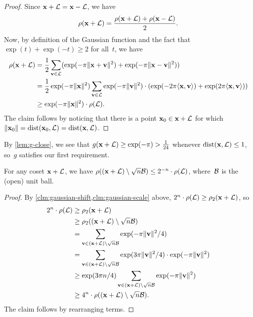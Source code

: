 \documentclass[11pt]{article}
\begin{document}
\begin{proof}
  Since $\mathbf{x}+\mathcal{L} = \mathbf{x}-\mathcal{L}$, we have
  \[ \rho(\mathbf{x}+\mathcal{L}) = \frac{\rho(\mathbf{x}+\mathcal{L}) +
      \rho(\mathbf{x}-\mathcal{L})}{2}. \] Now, by definition of the Gaussian
  function and the fact that $\exp(t) + \exp(-t) \geq 2$ for all~$t$,
  we have
  \begin{align*}
    \rho(\mathbf{x}+\mathcal{L})
    &= \frac12 \sum_{\mathbf{v} \in \mathcal{L}} ( \exp(-\pi \lVert\mathbf{x}+\mathbf{v}\rVert^2)+ \exp(-\pi \lVert\mathbf{x}-\mathbf{v}\rVert^2)) \\
    &= \frac12 \exp(-\pi \lVert\mathbf{x}\rVert^2)
      \sum_{\mathbf{v} \in \mathcal{L}} \exp(-\pi \lVert\mathbf{v}\rVert^2) \cdot
      (\exp(-2\pi \langle\mathbf{x},\mathbf{v}\rangle)+\exp(2\pi \langle\mathbf{x},\mathbf{v}\rangle)) \\
    &\geq \exp(-\pi \lVert\mathbf{x}\rVert^{2}) \cdot \rho(\mathcal{L}) .
  \end{align*}
  The claim follows by noticing that there is a point
  $\mathbf{x}_0 \in \mathbf{x} + \mathcal{L}$ for which
  $\lVert\mathbf{x}_0\rVert=\operatorname{dist}(\mathbf{x}_0,\mathcal{L}) = \operatorname{dist}(\mathbf{x},\mathcal{L})$.
\end{proof}
By \cref{lem:g-close}, we see that
$g(\mathbf{x} + \mathcal{L}) \geq \exp(-\pi) > \tfrac{1}{24}$ whenever
$\operatorname{dist}(\mathbf{x},\mathcal{L}) \leq 1$, so~$g$ satisfies our first requirement.

\begin{lemma}
  \label{lem:gaussian-mass-far}
  For any coset $\mathbf{x} + \mathcal{L}$, we have
  $\rho((\mathbf{x} + \mathcal{L}) \setminus \sqrt{n}\mathcal{B}) \leq 2^{-n} \cdot
  \rho(\mathcal{L})$, where~$\mathcal{B}$ is the (open) unit ball.
\end{lemma}

\begin{proof}
  By \cref{clm:gaussian-shift,clm:gaussian-scale} above,
  $2^n \cdot \rho(\mathcal{L}) \geq \rho_2(\mathbf{x} + \mathcal{L})$, so
  \begin{align*}
    2^n \cdot \rho(\mathcal{L})
    &\geq \rho_2(\mathbf{x} + \mathcal{L}) \\
    &\geq \rho_2((\mathbf{x} + \mathcal{L})\setminus \sqrt{n}\mathcal{B}) \\
    &= \sum_{\mathbf{v} \in (\mathbf{x} + \mathcal{L}) \setminus \sqrt{n}\mathcal{B}} \exp(-\pi \lVert\mathbf{v}\rVert^2/4) \\
    &= \sum_{\mathbf{v} \in (\mathbf{x} + \mathcal{L}) \setminus \sqrt{n}\mathcal{B}}
      \exp(3\pi \lVert\mathbf{v}\rVert^2/4) \cdot \exp(-\pi \lVert\mathbf{v}\rVert^2) \\
    &\geq \exp(3\pi n/4) \sum_{\mathbf{v} \in (\mathbf{x} + \mathcal{L}) \setminus
      \sqrt{n}\mathcal{B}}\exp(-\pi \lVert\mathbf{v}\rVert^2) \\
    &\geq  4^n \cdot \rho((\mathbf{x} + \mathcal{L})\setminus \sqrt{n}\mathcal{B}).
  \end{align*}
  The claim follows by rearranging terms.
\end{proof}
\end{document}
